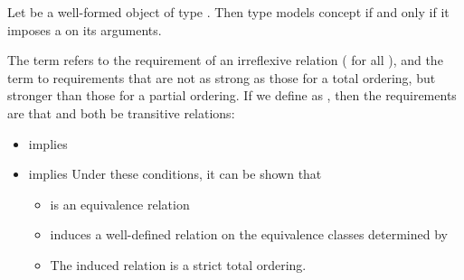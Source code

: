 \begin{itemdescr}
\color{newclr}
\pnum
Let  be a well-formed object of type . Then type  models concept
 if and only if it imposes a  on its arguments.
\color{black}


\pnum
The term
refers to the
requirement of an irreflexive relation ( for all ),
and the term
to requirements that are not as strong as
those for a total ordering,
but stronger than those for a partial
ordering.
If we define
as
,
then the requirements are that
and
both be transitive  relations:

\begin{itemize}
\item
{}
implies
\item
{}
implies
\enternote
Under these conditions, it can be shown that
\begin{itemize}
\item
{}
is an equivalence relation
\item
{}
induces a well-defined relation on the equivalence
classes determined by
\item
The induced relation is a strict total ordering.
\exitnote
\end{itemize}
\end{itemize}

\end{itemdescr}
